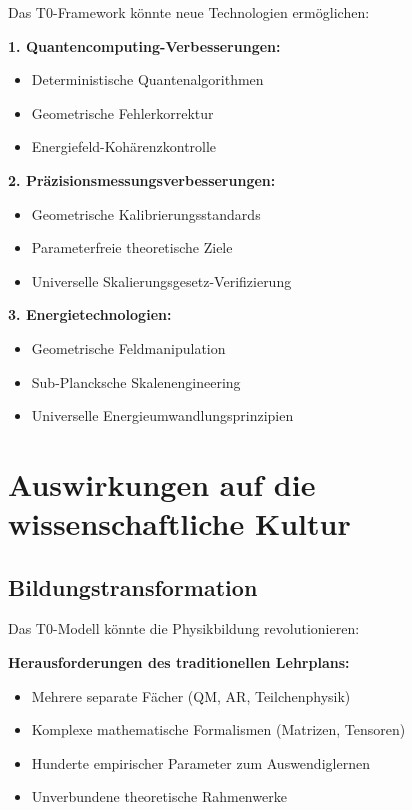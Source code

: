 \documentclass[12pt,a4paper]{report}
\begin{document}
	Das T0-Framework könnte neue Technologien ermöglichen:
	
	\textbf{1. Quantencomputing-Verbesserungen:}
	\begin{itemize}
		\item Deterministische Quantenalgorithmen
		\item Geometrische Fehlerkorrektur
		\item Energiefeld-Kohärenzkontrolle
	\end{itemize}
	
	\textbf{2. Präzisionsmessungsverbesserungen:}
	\begin{itemize}
		\item Geometrische Kalibrierungsstandards
		\item Parameterfreie theoretische Ziele
		\item Universelle Skalierungsgesetz-Verifizierung
	\end{itemize}
	
	\textbf{3. Energietechnologien:}
	\begin{itemize}
		\item Geometrische Feldmanipulation
		\item Sub-Plancksche Skalenengineering
		\item Universelle Energieumwandlungsprinzipien
	\end{itemize}
	
	\section{Auswirkungen auf die wissenschaftliche Kultur}
	\label{sec:impact_scientific_culture}
	
	\subsection{Bildungstransformation}
	\label{subsec:educational_transformation}
	
	Das T0-Modell könnte die Physikbildung revolutionieren:
	
	\textbf{Herausforderungen des traditionellen Lehrplans:}
	\begin{itemize}
		\item Mehrere separate Fächer (QM, AR, Teilchenphysik)
		\item Komplexe mathematische Formalismen (Matrizen, Tensoren)
		\item Hunderte empirischer Parameter zum Auswendiglernen
		\item Unverbundene theoretische Rahmenwerke
	\end{itemize}
	
\end{document}
